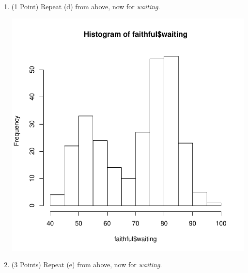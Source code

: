 \documentclass[12pt,letterpaper,final]{article}
\begin{document}
\begin{enumerate}
\begin{enumerate}
\item (1 Point) Repeat (d) from above, now for {\it waiting}.

\begin{Schunk}
\end{Schunk}
\includegraphics{rnw_example-008}





\item (3 Points) Repeat (e) from above, now for {\it waiting}.


\end{enumerate}
\end{enumerate}
\end{document}
